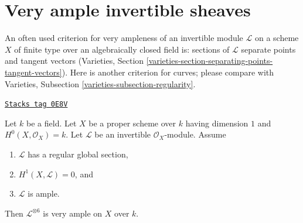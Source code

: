 \section{Very ample invertible sheaves}
\label{curves-section-very-ample}
An often used criterion for very ampleness of an invertible module
$\mathcal{L}$ on a scheme $X$ of finite type over an algebraically
closed field is: sections of $\mathcal{L}$ separate points and
tangent vectors (Varieties, Section
\ref{varieties-section-separating-points-tangent-vectors}). Here is another
criterion for curves; please compare with
Varieties, Subsection \ref{varieties-subsection-regularity}.

\begin{lemma}
\label{curves-lemma-criterion-very-ample}
\href{https://stacks.math.columbia.edu/tag/0E8V}{\texttt{Stacks tag 0E8V}}

Let $k$ be a field. Let $X$ be a proper scheme over $k$ having dimension $1$
and $H^0(X, \mathcal{O}_X) = k$. Let $\mathcal{L}$ be an invertible
$\mathcal{O}_X$-module. Assume
\begin{enumerate}
\item $\mathcal{L}$ has a regular global section,
\item $H^1(X, \mathcal{L}) = 0$, and
\item $\mathcal{L}$ is ample.
\end{enumerate}
Then $\mathcal{L}^{\otimes 6}$ is very ample on $X$ over $k$.
\end{lemma}

